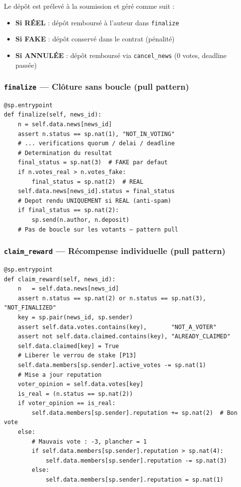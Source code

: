 \documentclass[12pt,a4paper]{article}
\newenvironment{warnbox}[1][Attention]{%
  \begin{tcolorbox}[
    enhanced, breakable,
    colback=warning!8, colframe=warning!70, coltitle=white,
    title=\textbf{#1}, fonttitle=\small,
    arc=4pt, boxrule=0.8pt,
    left=6pt, right=6pt, top=5pt, bottom=5pt
  ]
}{\end{tcolorbox}}
\newcommand{\entrypoint}[1]{\textcolor{primary}{\texttt{\textbf{#1}}}}
\begin{document}
\begin{warnbox}[Mécanisme anti-spam du dépôt]
Le dépôt est prélevé à la soumission et géré comme suit :
\begin{itemize}
  \item \textbf{Si RÉEL} : dépôt remboursé à l'auteur dans \texttt{finalize}
  \item \textbf{Si FAKE} : dépôt conservé dans le contrat (pénalité)
  \item \textbf{Si ANNULÉE} : dépôt remboursé via \texttt{cancel\_news} (0 votes, deadline passée)
\end{itemize}
\end{warnbox}

\subsubsection{\entrypoint{finalize} — Clôture sans boucle (pull pattern)}

\begin{lstlisting}[language=SmartPy, caption={Entrypoint finalize — pas de boucle de distribution}]
@sp.entrypoint
def finalize(self, news_id):
    n = self.data.news[news_id]
    assert n.status == sp.nat(1), "NOT_IN_VOTING"
    # ... verifications quorum / delai / deadline
    # Determination du resultat
    final_status = sp.nat(3)  # FAKE par defaut
    if n.votes_real > n.votes_fake:
        final_status = sp.nat(2)  # REAL
    self.data.news[news_id].status = final_status
    # Depot rendu UNIQUEMENT si REAL (anti-spam)
    if final_status == sp.nat(2):
        sp.send(n.author, n.deposit)
    # Pas de boucle sur les votants — pattern pull
\end{lstlisting}

\subsubsection{\entrypoint{claim\_reward} — Récompense individuelle (pull pattern)}

\begin{lstlisting}[language=SmartPy, caption={Entrypoint claim\_reward — chaque votant réclame individuellement}]
@sp.entrypoint
def claim_reward(self, news_id):
    n   = self.data.news[news_id]
    assert n.status == sp.nat(2) or n.status == sp.nat(3), "NOT_FINALIZED"
    key = sp.pair(news_id, sp.sender)
    assert self.data.votes.contains(key),       "NOT_A_VOTER"
    assert not self.data.claimed.contains(key), "ALREADY_CLAIMED"
    self.data.claimed[key] = True
    # Liberer le verrou de stake [P13]
    self.data.members[sp.sender].active_votes -= sp.nat(1)
    # Mise a jour reputation
    voter_opinion = self.data.votes[key]
    is_real = (n.status == sp.nat(2))
    if voter_opinion == is_real:
        self.data.members[sp.sender].reputation += sp.nat(2)  # Bon vote
    else:
        # Mauvais vote : -3, plancher = 1
        if self.data.members[sp.sender].reputation > sp.nat(4):
            self.data.members[sp.sender].reputation -= sp.nat(3)
        else:
            self.data.members[sp.sender].reputation = sp.nat(1)
\end{lstlisting}
\end{document}
